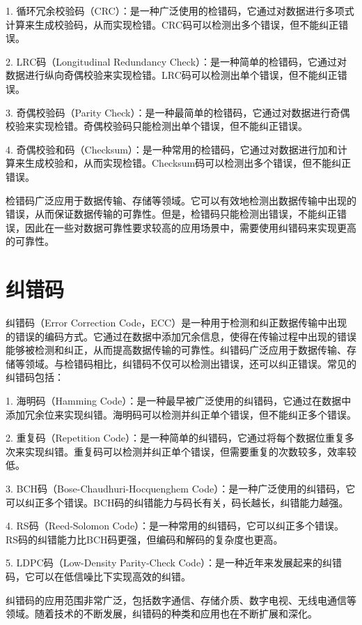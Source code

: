 1. 循环冗余校验码（CRC）：是一种广泛使用的检错码，它通过对数据进行多项式计算来生成校验码，从而实现检错。CRC码可以检测出多个错误，但不能纠正错误。

2. LRC码（Longitudinal Redundancy Check）：是一种简单的检错码，它通过对数据进行纵向奇偶校验来实现检错。LRC码可以检测出单个错误，但不能纠正错误。

3. 奇偶校验码（Parity Check）：是一种最简单的检错码，它通过对数据进行奇偶校验来实现检错。奇偶校验码只能检测出单个错误，但不能纠正错误。

4. 奇偶校验和码（Checksum）：是一种常用的检错码，它通过对数据进行加和计算来生成校验和，从而实现检错。Checksum码可以检测出多个错误，但不能纠正错误。

检错码广泛应用于数据传输、存储等领域。它可以有效地检测出数据传输中出现的错误，从而保证数据传输的可靠性。但是，检错码只能检测出错误，不能纠正错误，因此在一些对数据可靠性要求较高的应用场景中，需要使用纠错码来实现更高的可靠性。

\section{纠错码}

纠错码（Error Correction Code，ECC）是一种用于检测和纠正数据传输中出现的错误的编码方式。它通过在数据中添加冗余信息，使得在传输过程中出现的错误能够被检测和纠正，从而提高数据传输的可靠性。纠错码广泛应用于数据传输、存储等领域。与检错码相比，纠错码不仅可以检测出错误，还可以纠正错误。常见的纠错码包括：

1. 海明码（Hamming Code）：是一种最早被广泛使用的纠错码，它通过在数据中添加冗余位来实现纠错。海明码可以检测并纠正单个错误，但不能纠正多个错误。

2. 重复码（Repetition Code）：是一种简单的纠错码，它通过将每个数据位重复多次来实现纠错。重复码可以检测并纠正单个错误，但需要重复的次数较多，效率较低。

3. BCH码（Bose-Chaudhuri-Hocquenghem Code）：是一种广泛使用的纠错码，它可以纠正多个错误。BCH码的纠错能力与码长有关，码长越长，纠错能力越强。

4. RS码（Reed-Solomon Code）：是一种常用的纠错码，它可以纠正多个错误。RS码的纠错能力比BCH码更强，但编码和解码的复杂度也更高。

5. LDPC码（Low-Density Parity-Check Code）：是一种近年来发展起来的纠错码，它可以在低信噪比下实现高效的纠错。

纠错码的应用范围非常广泛，包括数字通信、存储介质、数字电视、无线电通信等领域。随着技术的不断发展，纠错码的种类和应用也在不断扩展和深化。

